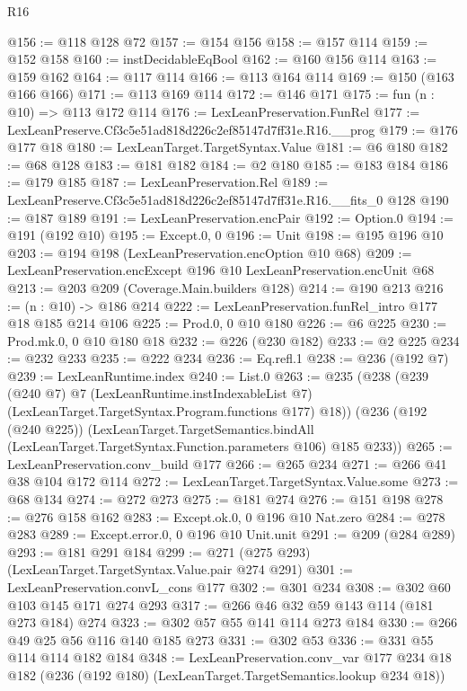 \begin{lexlean}{R16}
\begin{coremodule}
@156 := @118 @128 @72
@157 := @154 @156
@158 := @157 @114
@159 := @152 @158
@160 := instDecidableEqBool
@162 := @160 @156 @114
@163 := @159 @162
@164 := @117 @114
@166 := @113 @164 @114
@169 := @150 (@163 @166 @166)
@171 := @113 @169 @114
@172 := @146 @171
@175 := fun (n : @10) => @113 @172 @114
@176 := LexLeanPreservation.FunRel
@177 := LexLeanPreserve.Cf3c5e51ad818d226c2ef85147d7ff31e.R16.__prog
@179 := @176 @177 @18
@180 := LexLeanTarget.TargetSyntax.Value
@181 := @6 @180
@182 := @68 @128
@183 := @181 @182
@184 := @2 @180
@185 := @183 @184
@186 := @179 @185
@187 := LexLeanPreservation.Rel
@189 := LexLeanPreserve.Cf3c5e51ad818d226c2ef85147d7ff31e.R16.__fits_0 @128
@190 := @187 @189
@191 := LexLeanPreservation.encPair
@192 := Option.{0}
@194 := @191 (@192 @10)
@195 := Except.{0, 0}
@196 := Unit
@198 := @195 @196 @10
@203 := @194 @198 (LexLeanPreservation.encOption @10 @68)
@209 := LexLeanPreservation.encExcept @196 @10 LexLeanPreservation.encUnit @68
@213 := @203 @209 (Coverage.Main.builders @128)
@214 := @190 @213
@216 := (n : @10) -> @186 @214
@222 := LexLeanPreservation.funRel_intro @177 @18 @185 @214 @106
@225 := Prod.{0, 0} @10 @180
@226 := @6 @225
@230 := Prod.mk.{0, 0} @10 @180 @18
@232 := @226 (@230 @182)
@233 := @2 @225
@234 := @232 @233
@235 := @222 @234
@236 := Eq.refl.{1}
@238 := @236 (@192 @7)
@239 := LexLeanRuntime.index
@240 := List.{0}
@263 := @235
    (@238
      (@239
        (@240 @7)
        @7
        (LexLeanRuntime.instIndexableList @7)
        (LexLeanTarget.TargetSyntax.Program.functions @177)
        @18))
    (@236
      (@192 (@240 @225))
      (LexLeanTarget.TargetSemantics.bindAll
        (LexLeanTarget.TargetSyntax.Function.parameters @106)
        @185
        @233))
@265 := LexLeanPreservation.conv_build @177
@266 := @265 @234
@271 := @266 @41 @38 @104 @172 @114
@272 := LexLeanTarget.TargetSyntax.Value.some
@273 := @68 @134
@274 := @272 @273
@275 := @181 @274
@276 := @151 @198
@278 := @276 @158 @162
@283 := Except.ok.{0, 0} @196 @10 Nat.zero
@284 := @278 @283
@289 := Except.error.{0, 0} @196 @10 Unit.unit
@291 := @209 (@284 @289)
@293 := @181 @291 @184
@299 := @271 (@275 @293) (LexLeanTarget.TargetSyntax.Value.pair @274 @291)
@301 := LexLeanPreservation.convL_cons @177
@302 := @301 @234
@308 := @302 @60 @103 @145 @171 @274 @293
@317 := @266 @46 @32 @59 @143 @114 (@181 @273 @184) @274
@323 := @302 @57 @55 @141 @114 @273 @184
@330 := @266 @49 @25 @56 @116 @140 @185 @273
@331 := @302 @53
@336 := @331 @55 @114 @114 @182 @184
@348 := LexLeanPreservation.conv_var
    @177
    @234
    @18
    @182
    (@236 (@192 @180) (LexLeanTarget.TargetSemantics.lookup @234 @18))

\end{coremodule}
\end{lexlean}
